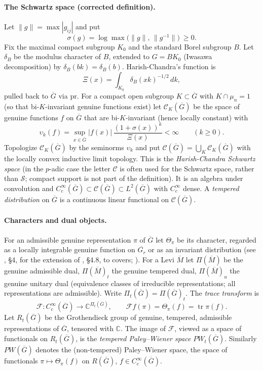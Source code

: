 \documentclass[12pt,letterpaper]{article}
\theoremstyle{definition}
\theoremstyle{remark}
\newcommand{\C}{\mathbb C}
\newcommand{\bG}{\overline{G}}
\newcommand{\pr}{\mathrm{pr}}
\newcommand{\Pit}{\Pi_t(\bG)}
\newcommand{\tr}{\operatorname{tr}}
\newcommand{\cS}{\mathcal S}
\newcommand{\calC}{\mathcal C}
\newcommand{\sF}{\mathscr F}
\begin{document}
\paragraph{The Schwartz space (corrected definition).} Let $\|g\|=\max|g_{ij}|$ and put
\[\sigma(g)=\log\max\bigl(\|g\|,\,\|g^{-1}\|\bigr)\ \ge0.\] Fix the maximal compact subgroup $K_0$ and the standard Borel
subgroup $B$. Let $\delta_B$ be the modulus character of $B$, extended to $G=BK_0$
(Iwasawa decomposition) by $\delta_B(bk)=\delta_B(b)$. Harish-Chandra's function is
\[
\Xi(x)=\int_{K_0}\delta_B(xk)^{-1/2}\,dk,
\]
pulled back to $\bG$ via $\pr$. For a compact open subgroup $K\subset\bG$ with $K\cap\mu_n=1$
(so that bi-$K$-invariant genuine functions exist) let $\calC_K(\bG)$ be the space of genuine
functions $f$ on $\bG$ that are bi-$K$-invariant (hence locally constant) with
\[
\upsilon_k(f)=\sup_{x\in\bG}|f(x)|\,\frac{(1+\sigma(x))^k}{\Xi(x)}<\infty\qquad(k\ge0).
\]
Topologize $\calC_K(\bG)$ by the seminorms $\upsilon_k$ and put
$\calC(\bG)=\bigcup_K\calC_K(\bG)$ with the locally convex inductive limit topology. This is the
\emph{Harish-Chandra Schwartz space} (in the $p$-adic case the letter $\calC$ is often used for the Schwartz space, rather than $\cS$;
compact support is not part of the definition). It is an algebra under convolution
and $C_c^\infty(\bG)\subset\calC(\bG)\subset L^2(\bG)$ with $C_c^\infty$ dense.
A \emph{tempered distribution} on $\bG$ is a continuous linear functional on $\calC(\bG)$.

\paragraph{Characters and dual objects.} For an admissible genuine representation $\pi$ of $\bG$ let
$\Theta_\pi$ be its character, regarded as a locally integrable genuine function on $\overline{G_r}$ or
as an invariant distribution (see \cite{Jo94}, \S4, for the extension of \cite{Si79}, \S4.8, to covers;
\cite{HC70,HC78}). For a Levi $\overline M$ let $\Pi(\overline M)$ be the genuine admissible dual,
$\Pi(\overline M)_t$ the genuine tempered dual, $\Pi(\overline M)_u$ the genuine unitary dual
(equivalence classes of irreducible representations; all representations are admissible).
Write $\Pit=\Pi(\bG)_t$. The \emph{trace transform} is
\[
\sF:C_c^\infty(\bG)\to\C^{\Pit},\qquad \sF f(\pi)=\Theta_\pi(f)=\tr\pi(f).
\]
Let $R_t(\bG)$ be the Grothendieck group of genuine, tempered, admissible representations of $\bG$,
tensored with $\C$. The image of $\sF$, viewed as a space of functionals on $R_t(\bG)$, is the
\emph{tempered Paley--Wiener space} $PW_t(\bG)$. Similarly $PW(\bG)$ denotes the (non-tempered)
Paley--Wiener space, the space of functionals $\pi\mapsto\Theta_\pi(f)$ on $R(\bG)$, $f\in C_c^\infty(\bG)$.
\end{document}
